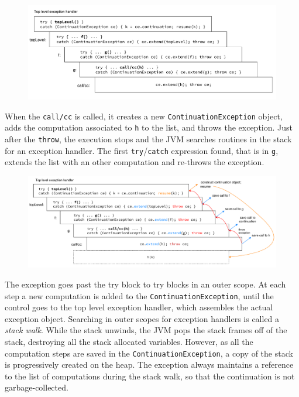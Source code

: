 \documentclass[12pt,a4paper,oneside,openright]{book}
\begin{document}
\begin{figure}[htbp]
\centering
\includegraphics{figures/stack.pdf}
\caption{\label{stack}}
\end{figure}

When the \texttt{call/cc} is called, it creates a new
\texttt{ContinuationException} object, adds the computation associated
to \texttt{h} to the list, and throws the exception. Just after the
\texttt{throw}, the execution stops and the JVM searches routines in the
stack for an exception handler. The first \texttt{try}/\texttt{catch}
expression found, that is in \texttt{g}, extends the list with an other
computation and re-throws the exception.

\begin{figure}[htbp]
\centering
\includegraphics{figures/stack_mod.pdf}
\caption{\label{stack-mod}}
\end{figure}

The exception goes past the try block to try blocks in an outer scope.
At each step a new computation is added to the
\texttt{ContinuationException}, until the control goes to the top level
exception handler, which assembles the actual exception object.
Searching in outer scopes for exception handlers is called a \emph{stack
walk}. While the stack unwinds, the JVM pops the stack frames off of the
stack, destroying all the stack allocated variables. However, as all the
computation steps are saved in the \texttt{ContinuationException}, a
copy of the stack is progressively created on the heap. The exception
always maintains a reference to the list of computations during the
stack walk, so that the continuation is not garbage-collected.
\end{document}
